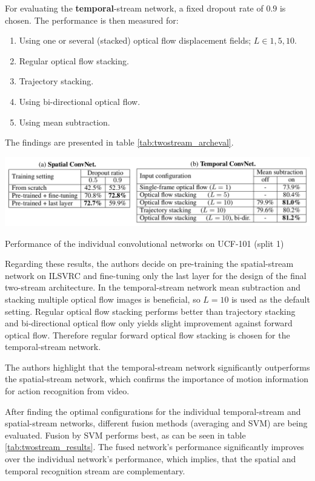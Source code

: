For evaluating the \textbf{temporal}-stream network, a fixed dropout rate of $0.9$ is chosen.
The performance is then measured for:
\begin{enumerate}
    \item Using one or several (stacked) optical flow displacement fields; $L \in {1,5,10}$.
    \item Regular optical flow stacking.
    \item Trajectory stacking.
    \item Using bi-directional optical flow.
    \item Using mean subtraction.
\end{enumerate}

The findings are presented in table \ref{tab:twostream_archeval}.
\begin{table}[H]
    \centering
    \includegraphics[width=\textwidth]{img_deep/twostream_archeval}
    \caption{Performance of the individual convolutional networks on UCF-101 (split 1) \cite{simonyan_two-stream_2014}}
    \label{tab:twostream_archeval}
\end{table}

Regarding these results, the authors decide on pre-training the spatial-stream network on ILSVRC and fine-tuning only the last layer for the design of the final two-stream architecture.
In the temporal-stream network mean subtraction and stacking multiple optical flow images is beneficial, so $L=10$ is used as the default setting.
Regular optical flow stacking performs better than trajectory stacking and bi-directional optical flow only yields slight improvement against forward optical flow.
Therefore regular forward optical flow stacking is chosen for the temporal-stream network.

The authors highlight that the temporal-stream network significantly outperforms the spatial-stream network, which confirms the importance of motion information for action recognition from video.

After finding the optimal configurations for the individual temporal-stream and spatial-stream networks, different fusion methods (averaging and SVM) are being evaluated.
Fusion by SVM performs best, as can be seen in table \ref{tab:twostream_results}.
The fused network's performance significantly improves over the individual network's performance, which implies, that the spatial and temporal recognition stream are complementary.

